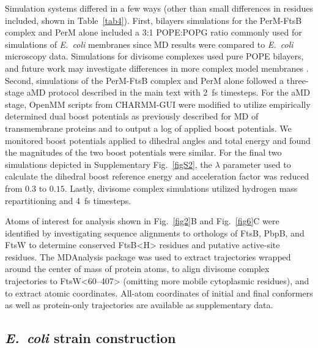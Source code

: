 \documentclass[pdflatex,sn-nature]{sn-jnl}%
\def\textsuperscript#1{<#1>}%
\newcommand\ec{\textit{E.~coli}}
\newcommand\ftsbH{FtsB\textsuperscript{H}}
\begin{document}
Simulation systems differed in a few ways (other than small differences in residues included, shown in Table~\ref{tab4}).
First, bilayers simulations for the PerM-FtsB complex and PerM alone included a 3:1 POPE:POPG ratio commonly used for simulations of \ec{} membranes since MD results were compared to \ec{} microscopy data.
Simulations for divisome complexes used pure POPE bilayers, and future work may investigate differences in more complex model membranes \cite{brownMolecularModelingSimulation2023}.
Second, simulations of the PerM-FtsB complex and PerM alone followed a three-stage aMD protocol described in the main text with \qty{2}{\fs} timesteps.
For the aMD stage, OpenMM scripts from CHARMM-GUI \citep{suhCHARMMGUIEnhancedSampler2022} were modified to utilize empirically determined dual boost potentials as previously described for MD of transmembrane proteins \citep{miaoActivationDynamicNetwork2013} and to output a log of applied boost potentials.
We monitored boost potentials applied to dihedral angles and total energy and found the magnitudes of the two boost potentials were similar.
For the final two simulations depicted in Supplementary Fig.~\ref{figS2}, the $\lambda$ parameter used to calculate the dihedral boost reference energy and acceleration factor was reduced from $0.3$ to $0.15$.
Lastly, divisome complex simulations utilized hydrogen mass repartitioning \citep{gaoCHARMMGUISupportsHydrogen2021} and \qty{4}{\fs} timesteps.

Atoms of interest for analysis shown in Fig.~\ref{fig2}B and Fig.~\ref{fig6}C were identified by investigating sequence alignments to orthologs of FtsB, PbpB, and FtsW to determine conserved \ftsbH{} residues and putative active-site residues.
The MDAnalysis package \cite{gowersMDAnalysisPythonPackage2016, michaud-agrawalMDAnalysisToolkitAnalysis2011} was used to extract trajectories wrapped around the center of mass of protein atoms, to align divisome complex trajectories to FtsW\textsuperscript{60--407} (omitting more mobile cytoplasmic residues), and to extract atomic coordinates.
All-atom coordinates of initial and final conformers as well as protein-only trajectories are available as supplementary data.

\subsection{\ec{} strain construction}
\end{document}
